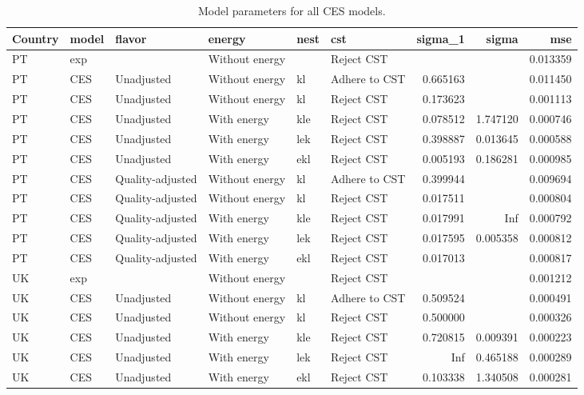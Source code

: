 \documentclass[preprint,authoryear,12pt]{elsarticle}\usepackage[]{graphicx}\usepackage[]{color}
\begin{document}
%
\begin{table}[ht]
\centering
\caption{Model parameters for all CES models.} 
\label{tab:CES_coeffs_sigmas}
{\tiny
\begin{tabular}{llllllrrr}
  \hline
Country & model & flavor & energy & nest & cst & sigma\_1 & sigma & mse \\ 
  \hline
PT & exp &  & Without energy &  & Reject CST &  &  & 0.013359 \\ 
  PT & CES & Unadjusted & Without energy & kl & Adhere to CST & 0.665163 &  & 0.011450 \\ 
  PT & CES & Unadjusted & Without energy & kl & Reject CST & 0.173623 &  & 0.001113 \\ 
  PT & CES & Unadjusted & With energy & kle & Reject CST & 0.078512 & 1.747120 & 0.000746 \\ 
  PT & CES & Unadjusted & With energy & lek & Reject CST & 0.398887 & 0.013645 & 0.000588 \\ 
  PT & CES & Unadjusted & With energy & ekl & Reject CST & 0.005193 & 0.186281 & 0.000985 \\ 
  PT & CES & Quality-adjusted & Without energy & kl & Adhere to CST & 0.399944 &  & 0.009694 \\ 
  PT & CES & Quality-adjusted & Without energy & kl & Reject CST & 0.017511 &  & 0.000804 \\ 
  PT & CES & Quality-adjusted & With energy & kle & Reject CST & 0.017991 &     Inf & 0.000792 \\ 
  PT & CES & Quality-adjusted & With energy & lek & Reject CST & 0.017595 & 0.005358 & 0.000812 \\ 
  PT & CES & Quality-adjusted & With energy & ekl & Reject CST & 0.017013 &  & 0.000817 \\ 
  UK & exp &  & Without energy &  & Reject CST &  &  & 0.001212 \\ 
  UK & CES & Unadjusted & Without energy & kl & Adhere to CST & 0.509524 &  & 0.000491 \\ 
  UK & CES & Unadjusted & Without energy & kl & Reject CST & 0.500000 &  & 0.000326 \\ 
  UK & CES & Unadjusted & With energy & kle & Reject CST & 0.720815 & 0.009391 & 0.000223 \\ 
  UK & CES & Unadjusted & With energy & lek & Reject CST &     Inf & 0.465188 & 0.000289 \\ 
  UK & CES & Unadjusted & With energy & ekl & Reject CST & 0.103338 & 1.340508 & 0.000281 \\ 

\end{tabular}}
\end{table}
\end{document}
